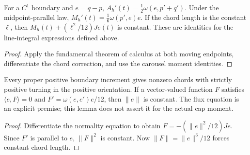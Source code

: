 \begin{lemma}
\label{lem:cap-boundary-derivatives}
\leanok
{}
For a $C^1$ boundary and $e=q-p$,
$A_h'(t)=\tfrac12\omega(e,p'+q')$.
Under the midpoint-parallel law,
$M_h'(t)=\tfrac16\omega(p',e)e$.
If the chord length is the constant $\ell$, then
$M_h(t)+(\ell^2/12)Je(t)$ is constant.
These are identities for the line-integral expressions defined above.
\end{lemma}
\begin{proof}
\leanok
Apply the fundamental theorem of calculus at both moving endpoints,
differentiate the chord correction, and use the carousel moment identities.
\end{proof}

\begin{lemma}
\label{lem:auerbach-kinematics}
\leanok
{}
Every proper positive boundary increment gives nonzero chords with strictly
positive turning in the positive orientation. If a vector-valued function $F$
satisfies
$\langle e,F\rangle=0$ and $F'=\omega(e,e')e/12$, then $\|e\|$ is constant.
The flux equation is an explicit premise; this lemma does not assert it for
the actual cap moment.
\end{lemma}
\begin{proof}
\leanok
Differentiate the normality equation to obtain
$F=-(\|e\|^2/12)Je$. Since $F'$ is parallel to $e$, $\|F\|^2$ is constant.
Now $\|F\|=\|e\|^3/12$ forces constant chord length.
\end{proof}

